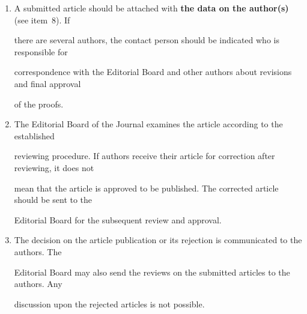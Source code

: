 {{\begin{enumerate}[1.]
\textit{Author(s) signature(s): (name(s), address(es), date).''}





This agreement should be submitted in paper form or in the form of a scanned copy (signed by


the authors).





The Editorial Board has the right to request from the authors an official expert conclusion that


the submitted article has no classified data prohibited for publication. \\[-14pt]


\item


A submitted article should be attached with \textbf{the data on the author(s)} (see item~8). If


there are several authors, the contact person should be indicated who is responsible for


correspondence with the Editorial Board and other authors about revisions and final approval


of the proofs.\\[-14pt]





\item The Editorial Board of the Journal examines the article according to the established


reviewing procedure. If authors receive their article for correction after reviewing, it does not


mean that the article is approved to be published. The corrected article should be sent to the


Editorial Board for the subsequent review and approval.\\[-14pt]





\item The decision on the article publication or its rejection is communicated to the authors. The


Editorial Board may also send the reviews on the submitted articles to the authors. Any


discussion upon the rejected articles is not possible.\\[-14pt]






\end{enumerate}}}
